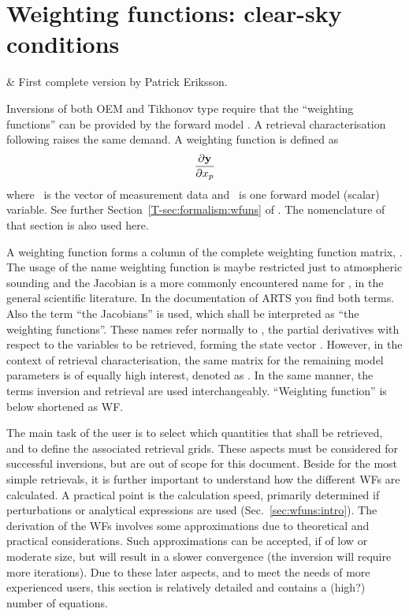 \chapter{Weighting functions: clear-sky conditions}
 \label{sec:wfuns}

  & First complete version by Patrick Eriksson.\\
 \stophistory

\graphicspath{{Figs/wfuns/}}


Inversions of both OEM and Tikhonov type require that the ``weighting
functions'' can be provided by the forward model \citep[see
e.g.][]{eriksson:analy:00}. A retrieval characterisation following
\citet{rodgers:90,rodgers:00} raises the same demand. A weighting function is
defined as
\begin{equation}
  \frac{\partial\mathbf{y}}{\partial x_{p}}
  \label{eq:wfuns:ki}
\end{equation}
where \MsrVct\ is the vector of measurement data and \ is one forward
model (scalar) variable. See further Section~\ref{T-sec:formalism:wfuns} of
\theory. The nomenclature of that section is also used here.

A weighting function forms a column of the complete weighting function matrix,
\aWfnMtr{\SttVct}. The usage of the name weighting function is maybe restricted
just to atmospheric sounding and the Jacobian is a more commonly encountered
name for \aWfnMtr{\SttVct}, in the general scientific literature. In the
documentation of ARTS you find both terms. Also the term ``the Jacobians'' is
used, which shall be interpreted as ``the weighting functions''. These names
refer normally to \aWfnMtr{\SttVct}, the partial derivatives with respect to
the variables to be retrieved, forming the state vector \SttVct. However, in
the context of retrieval characterisation, the same matrix for the remaining
model parameters is of equally high interest, denoted as \aWfnMtr{\FrwMdlVct}.
In the same manner, the terms inversion and retrieval are used interchangeably.
``Weighting function'' is below shortened as WF.

The main task of the user is to select which quantities that shall be
retrieved, and to define the associated retrieval grids. These aspects must be
considered for successful inversions, but are out of scope for this document.
Beside for the most simple retrievals, it is further important to understand
how the different WFs are calculated. A practical point is the calculation
speed, primarily determined if perturbations or analytical expressions are used
(Sec.~\ref{sec:wfuns:intro}). The derivation of the WFs involves some
approximations due to theoretical and practical considerations. Such
approximations can be accepted, if of low or moderate size, but will result in
a slower convergence (the inversion will require more iterations). Due to these
later aspects, and to meet the needs of more experienced users, this section is
relatively detailed and contains a (high?) number of equations.

